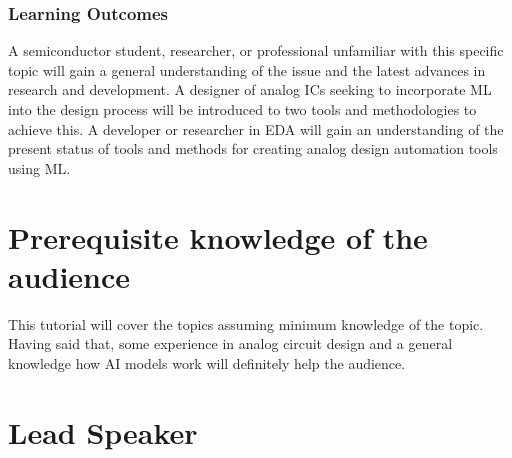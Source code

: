 \documentclass[12pt]{article}
\begin{document}
\subsubsection*{Learning Outcomes}
A semiconductor student, researcher, or professional unfamiliar with this specific topic will gain a general understanding of the issue and the latest advances in research and development. A designer of analog ICs seeking to incorporate ML into the design process will be introduced to two tools and methodologies to achieve this. A developer or researcher in EDA will gain an understanding of the present status of tools and methods for creating analog design automation tools using ML.

\section*{Prerequisite knowledge of the audience}
This tutorial will cover the topics assuming minimum knowledge of the topic. Having said that, some experience in analog circuit design and a general knowledge how AI models work will definitely help the audience.

\pagebreak
\section*{Lead Speaker}
\end{document}
